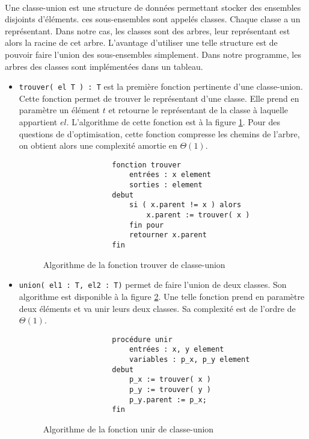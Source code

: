 \documentclass[a4paper]{article}
\begin{document}
		    \paragraph{}{
		    Une classe-union est une structure de données permettant stocker des ensembles 
		    disjoints d'éléments. ces sous-ensembles sont appelés classes. Chaque classe a
		    un représentant. Dans notre cas, les classes sont des arbres, leur représentant
		    est alors la racine de cet arbre. L'avantage d'utiliser une telle structure est
		    de pouvoir faire l'union des sous-ensembles simplement. Dans notre programme, 
		    les arbres des classes sont implémentées dans un tableau.
		    }
		    \begin{itemize}
			    \item \verb|trouver( el T ) : T| est la première fonction pertinente d'une classe-union. Cette fonction permet de trouver 
	    	le représentant d'une classe. Elle prend en paramètre un élément $t$ et retourne le représentant de la classe à
	    	laquelle appartient $el$.
	    	L'algorithme de cette fonction est à la figure \ref{algo_find}. Pour des questions de d'optimisation, cette fonction
	    	compresse les chemins de l'arbre, on obtient alors une complexité amortie en $\Theta(1)$.
	    	
	    	\begin{figure}
	    	    \begin{verbatim}
	    	    fonction trouver
	    	        entrées : x element
	    	        sorties : element
	    	    debut
	    	        si ( x.parent != x ) alors
	    	            x.parent := trouver( x )
	    	        fin pour
	    	        retourner x.parent
	    	    fin
	    	    \end{verbatim}
	    	\caption{Algorithme de la fonction trouver de classe-union \label{algo_find}}
	    	\end{figure}
	    	
	    	\item \verb|union( el1 : T, el2 : T)| permet de faire l'union de deux classes. Son algorithme est disponible à la 
	        figure \ref{algo_union}. Une telle fonction prend en paramètre deux éléments et va unir leurs deux classes.
	        Sa complexité est de l'ordre de $\Theta(1)$.

	    	\begin{figure}
	    	    \begin{verbatim}
	    	    procédure unir
	    	        entrées : x, y element
	    	        variables : p_x, p_y element
	    	    debut
	    	        p_x := trouver( x )
	    	        p_y := trouver( y )
	    	        p_y.parent := p_x;
	    	    fin
	    	    \end{verbatim}
	    	\caption{Algorithme de la fonction unir de classe-union \label{algo_union}}
	    	\end{figure}
	    	\end{itemize}
		
\end{document}
